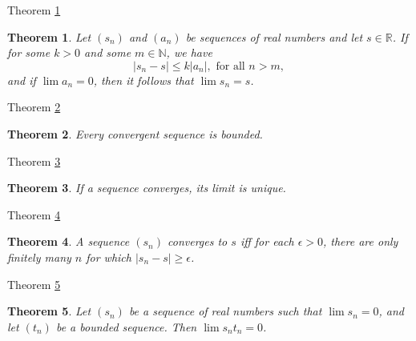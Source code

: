 \documentclass[avery5371,grid]{flashcards}
\newtheorem{theorem}{Theorem}
\newcommand{\bb}[1]{\mathbb{#1}}
\newcommand{\R}{\bb{R}}
\newcommand{\N}{\bb{N}}
\begin{document}
\begin{flashcard}[Theorem]{Theorem \ref{thm47}}
\begin{theorem}
\label{thm47}
Let $(s_n)$ and $(a_n)$ be sequences of real numbers and let $s \in \R$.
If for some $k > 0$ and some $m \in \N$, we have
$$|s_n - s| \leq k|a_n|, \mbox{ for all } n > m,$$
and if $\lim a_n = 0$, then it follows that $\lim s_n = s$.
\end{theorem}
\end{flashcard}

\begin{flashcard}[Theorem]{Theorem \ref{thm48}}
\begin{theorem}
\label{thm48}
Every convergent sequence is bounded.
\end{theorem}
\end{flashcard}

\begin{flashcard}[Theorem]{Theorem \ref{thm49}}
\begin{theorem}
\label{thm49}
If a sequence converges, its limit is unique.
\end{theorem}
\end{flashcard}

\begin{flashcard}[Theorem]{Theorem \ref{thm50}}
\begin{theorem}
\label{thm50}
A sequence $(s_n)$ converges to $s$ iff for each $\epsilon > 0$, there
are only finitely many $n$ for which $|s_n - s| \geq \epsilon$.
\end{theorem}
\end{flashcard}

\begin{flashcard}[Theorem]{Theorem \ref{thm51}}
\begin{theorem}
\label{thm51}
Let $(s_n)$ be a sequence of real numbers such that $\lim s_n = 0$, and
let $(t_n)$ be a bounded sequence.  Then $\lim s_nt_n = 0$.
\end{theorem}
\end{flashcard}
\end{document}
